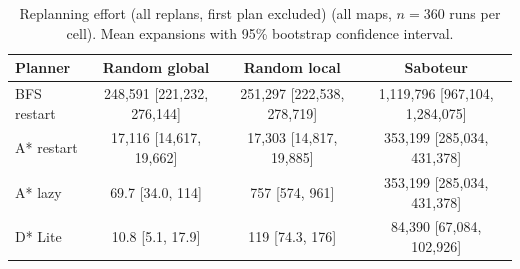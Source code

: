 \begin{table}[!t]
\centering
\footnotesize
\caption{Replanning effort (all replans, first plan excluded) (all maps, $n=360$ runs per cell). Mean expansions with 95\% bootstrap confidence interval.}
\label{tab:replan}
\begin{tabular}{lccc}
\toprule
Planner & Random global & Random local & Saboteur \\
\midrule
BFS restart & 248,591 [221,232, 276,144] & 251,297 [222,538, 278,719] & 1,119,796 [967,104, 1,284,075] \\
A* restart & 17,116 [14,617, 19,662] & 17,303 [14,817, 19,885] & 353,199 [285,034, 431,378] \\
A* lazy & 69.7 [34.0, 114] & 757 [574, 961] & 353,199 [285,034, 431,378] \\
D* Lite & 10.8 [5.1, 17.9] & 119 [74.3, 176] & 84,390 [67,084, 102,926] \\
\bottomrule
\end{tabular}
\end{table}
